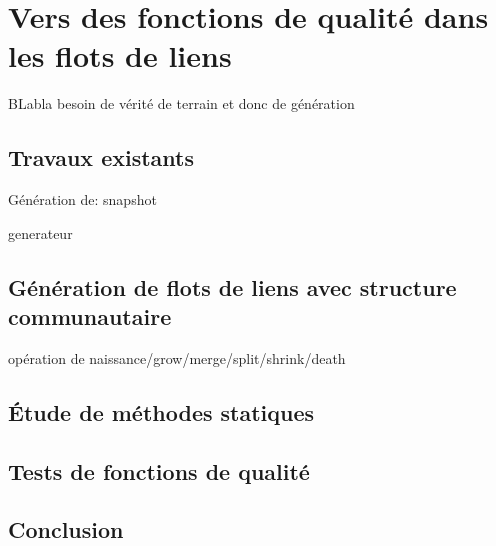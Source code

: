 \chapter{Vers des fonctions de qualité dans les flots de liens}
\minitoc
\label{versQualite}
BLabla besoin de vérité de terrain et donc de génération

\section{Travaux existants}

Génération de: \cite{Granell2015a, Karsai2014,Perra2012} snapshot

generateur \cite{Starnini2013,Vestergaard2014}
\cite{Moinet2015}
\cite{Stehle2010}



\section{Génération de flots de liens avec structure communautaire}

opération de naissance/grow/merge/split/shrink/death

\section{Étude de méthodes statiques}

\section{Tests de fonctions de qualité}

\section{Conclusion}
